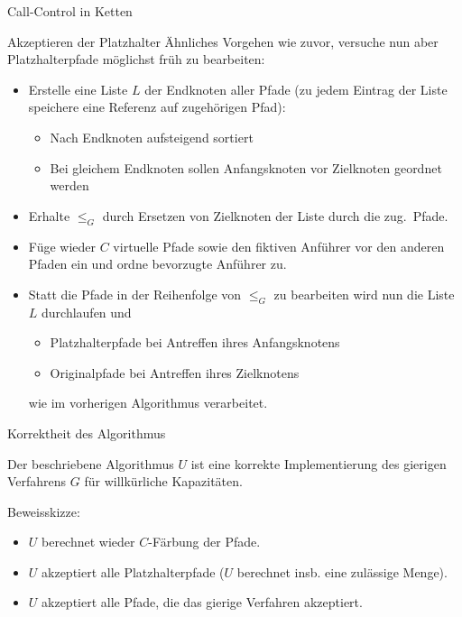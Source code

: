 \begin{section}{Call-Control in Ketten}
\begin{frame}{Akzeptieren der Platzhalter}
	\pause Ähnliches Vorgehen wie zuvor, versuche nun aber Platzhalterpfade möglichst früh zu bearbeiten:
	\begin{itemize}
		\pause\item Erstelle eine Liste $L$ der Endknoten aller Pfade (zu jedem Eintrag der Liste speichere eine Referenz auf zugehörigen Pfad):
		\pause\begin{itemize}
			\item Nach Endknoten aufsteigend sortiert
			\item Bei gleichem Endknoten sollen Anfangsknoten vor Zielknoten geordnet werden
		\end{itemize}
		\pause\item Erhalte $\leq_G$ durch Ersetzen von Zielknoten der Liste durch die zug.\ Pfade.
		\pause\item Füge wieder $C$ virtuelle Pfade sowie den fiktiven Anführer vor den anderen Pfaden ein und ordne bevorzugte Anführer zu.
		\pause\item Statt die Pfade in der Reihenfolge von $\leq_G$ zu bearbeiten wird nun die Liste $L$ durchlaufen und
		\begin{itemize}
			\item Platzhalterpfade bei Antreffen ihres Anfangsknotens
			\item Originalpfade bei Antreffen ihres Zielknotens
		\end{itemize}
	 wie im vorherigen Algorithmus verarbeitet.
	\end{itemize}
\end{frame}

\begin{frame}{Korrektheit des Algorithmus}
	\begin{lemma}
		Der beschriebene Algorithmus $U$ ist eine korrekte Implementierung des gierigen Verfahrens $G$ für willkürliche Kapazitäten.
	\end{lemma}
	Beweisskizze: 
	\begin{itemize}
		\pause\item $U$ berechnet wieder $C$-Färbung der Pfade.
		\pause\item $U$ akzeptiert alle Platzhalterpfade ($U$ berechnet insb. eine zulässige Menge).
		\pause\item $U$ akzeptiert alle Pfade, die das gierige Verfahren akzeptiert.
	\end{itemize}
\end{frame}


\end{section}

